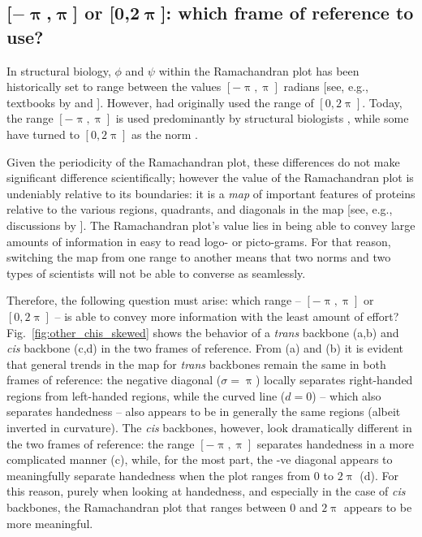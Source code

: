 \documentclass[fleqn,10pt,lineno]{wlpeerj} %
\newcommand{\n}[1]{{\color{black}#1}} %
\newcommand{\Fig}[1]{Fig.~\ref{#1}}
\newcommand{\cis}{{\em cis}\xspace}
\newcommand{\trans}{{\em trans}\xspace}
\begin{document}
\subsection*{[$\bm{-\uppi}$,$\bm{\uppi}$] or [$\bm{0}$,$\bm{2\uppi}$]: which frame of reference to use?} 
In structural biology, $\phi$ and $\psi$ within the Ramachandran plot has been historically set to range between the values $[-\uppi,\uppi]$ radians [see, e.g., textbooks by \cite{Berg2006} and \cite{Alberts2002}]. However, \cite{Ramachandran1963} had originally used the range of $[0,2\uppi]$. Today, the range $[-\uppi,\uppi]$ is used predominantly by structural biologists \citep{Laskowski1993,Laskowski2003,Zacharias2013}, while some have turned to $[0,2\uppi]$ as the norm \citep{Nemethy1966,Voelz2011}. 

Given the periodicity of the Ramachandran plot, these differences do not make \n{significant} difference scientifically; however the value of the Ramachandran plot is undeniably relative to its boundaries: it is a {\em map} of important features of proteins relative to the various regions, quadrants, and diagonals in the map [see, e.g., discussions by \cite{Beck2008}]. The Ramachandran plot's value lies in being able to convey large amounts of information in easy to read logo- or picto-grams. For that reason, switching the map from one range to another means that two norms and two types of scientists will not be able to converse as seamlessly.

Therefore, the following question must arise: which range -- $[-\uppi,\uppi]$ or $[0,2\uppi]$ -- is able to convey more information with the least amount of effort? \Fig{fig:other_chis_skewed} shows the behavior of a \trans backbone (a,b) and \cis backbone (c,d) in the two frames of reference. From (a) and (b) it is evident that general trends in the map for \trans backbones remain the same in both frames of reference: the negative diagonal ($\sigma=\uppi$) locally separates right-handed regions from left-handed regions, while the curved line ($d=0$) -- which also separates handedness -- also appears to be in generally the same regions (albeit inverted in curvature). The \cis backbones, however, look dramatically different in the two frames of reference: the range $[-\uppi,\uppi]$ separates handedness in a more complicated manner (c), \n{while, for the most part,} the -ve diagonal appears \n{to} meaningfully \n{separate} handedness when the plot ranges from $0$ to $2\uppi$ (d). For this reason, purely when looking at handedness, and especially in the case of \cis backbones, the Ramachandran plot that ranges between 0 and $2\uppi$ appears to be more meaningful.
\end{document}
